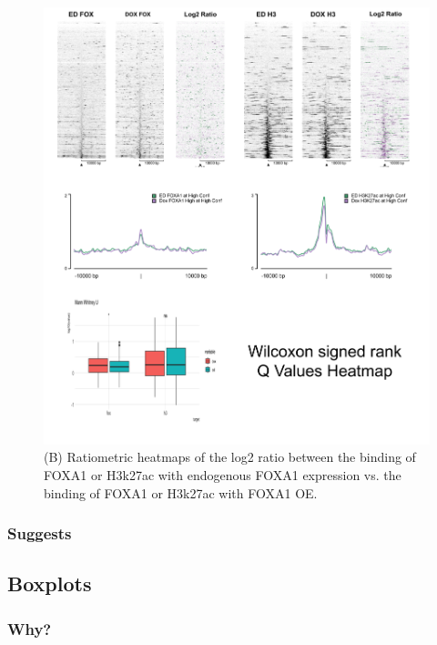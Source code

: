 \documentclass[
  12pt,
]{article}
\begin{document}
\begin{figure}

{\centering \includegraphics[width=1\linewidth]{../images/results-01} 

}

\caption{(B) Ratiometric heatmaps of the log2 ratio between the binding of FOXA1 or H3k27ac with endogenous FOXA1 expression vs. the binding of FOXA1 or H3k27ac with FOXA1 OE.}\label{fig:results-1}
\end{figure}

\hypertarget{suggests}{%
\subsubsection{Suggests}\label{suggests}}

\hypertarget{boxplots}{%
\subsection{Boxplots}\label{boxplots}}

\hypertarget{why}{%
\subsubsection{Why?}\label{why}}
\end{document}
